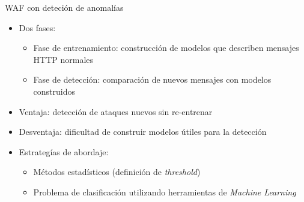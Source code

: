 \begin{frame}
    \begin{exampleblock}{WAF con deteción de anomalías}
        \begin{itemize}
            \item<1->
            Dos fases:

            \begin{itemize}[<.->]
                \item
                Fase de entrenamiento: construcción de modelos que describen
                mensajes HTTP normales

                \item
                Fase de detección: comparación de nuevos mensajes con
                modelos construidos
            \end{itemize}

            \item<2->
            Ventaja: detección de ataques nuevos sin re-entrenar

            \item<2->
            Desventaja: dificultad de construir modelos útiles para la detección

            \item<3->
            Estrategías de abordaje:

            \begin{itemize}[<.->]
                \item
                Métodos estadísticos (definición de \textit{threshold})

                \item
                \alert{Problema de clasificación utilizando herramientas de
                \textit{Machine Learning}}
            \end{itemize}
        \end{itemize}
    \end{exampleblock}
\end{frame}

